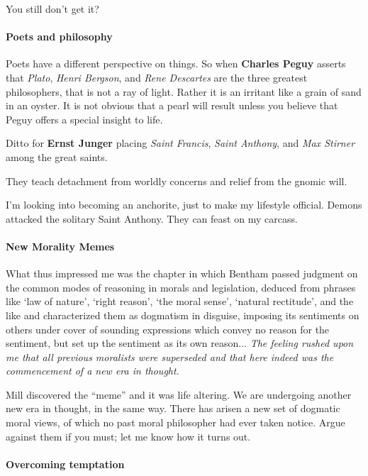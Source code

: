 You still don't get it?

\paragraph{Poets and philosophy}


Poets have a different perspective on things. So when \textbf{Charles Peguy} asserts that \emph{Plato}, \emph{Henri Bergson}, and \emph{Rene Descartes} are the three greatest philosophers, that is not a ray of light. Rather it is an irritant like a grain of sand in an oyster. It is not obvious that a pearl will result unless you believe that Peguy offers a special insight to life.

Ditto for \textbf{Ernst Junger} placing \emph{Saint Francis}, \emph{Saint Anthony}, and \emph{Max Stirner} among the great saints.

They teach detachment from worldly concerns and relief from the gnomic will.

I'm looking into becoming an anchorite, just to make my lifestyle official. Demons attacked the solitary Saint Anthony. They can feast on my carcass.

\paragraph{New Morality Memes}


\begin{quotex}
What thus impressed me was the chapter in which Bentham passed judgment on the common modes of reasoning in morals and legislation, deduced from phrases like `law of nature', `right reason', `the moral sense', `natural rectitude', and the like and characterized them as dogmatism in disguise, imposing its sentiments on others under cover of sounding expressions which convey no reason for the sentiment, but set up the sentiment as its own reason... \emph{The feeling rushed upon me that all previous moralists were superseded and that here indeed was the commencement of a new era in thought.}
\end{quotex}


Mill discovered the ``meme'' and it was life altering. We are undergoing another new era in thought, in the same way. There has arisen a new set of dogmatic moral views, of which no past moral philosopher had ever taken notice. Argue against them if you must; let me know how it turns out.

\paragraph{Overcoming temptation}


